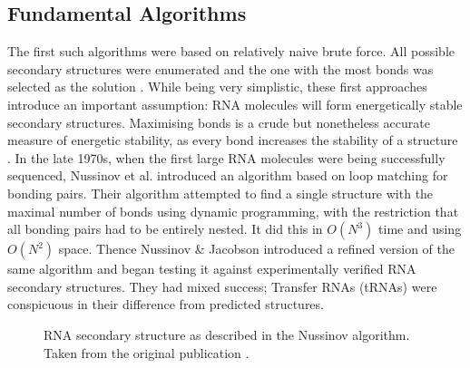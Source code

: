 \documentclass{cshonours}
\begin{document}
\subsection{Fundamental Algorithms}
The first such algorithms were based on relatively naive brute force. All possible secondary structures were enumerated and the one with
the most bonds was selected as the solution \cite{nussinov1978algorithms}. While being very simplistic,
these first approaches introduce an important assumption: RNA molecules will
form energetically stable secondary structures. Maximising bonds is a crude but
nonetheless accurate measure of energetic stability, as every bond increases the
stability of a structure \cite{nussinov1978algorithms}. In the late 1970s, when the first large RNA molecules
were being successfully sequenced, Nussinov et al. \cite{nussinov1978algorithms} introduced an algorithm
based on loop matching for bonding pairs. Their algorithm attempted to find a
single structure with the maximal number of bonds using dynamic programming,
with the restriction that all bonding pairs had to be entirely nested. It did this in $O(N^3)$ time and using $O(N^2)$ space. Thence Nussinov \& Jacobson \cite{nussinov1980fast} introduced
a refined version of the same algorithm and began testing it against experimentally verified RNA secondary structures. They had mixed success; Transfer RNAs
(tRNAs) were conspicuous in their difference from predicted structures.

\begin{figure}
\begin{center}
\end{center}
\caption{RNA secondary structure as described in the Nussinov algorithm.
Taken from the original publication \cite{nussinov1980fast}.}
\label{nuss_rna}
\end{figure}
\end{document}
